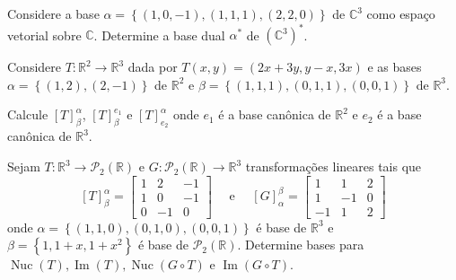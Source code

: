 \begin{questions}
	\question\label{exercício:2.14}

	Considere a base
	\begin{math}
		\alpha=
		\left\{
		\left(1,0,-1\right),
		\left(1,1,1\right),
		\left(2,2,0\right)
		\right\}
	\end{math}
	de $\mathbb{C}^{3}$ como espaço vetorial sobre $\mathbb{C}$.
	Determine a base dual $\alpha^{\ast}$ de
	${\left(\mathbb{C}^{3}\right)}^{\ast}$.

	\begin{solutionordottedlines}
	\end{solutionordottedlines}

	\question\label{exercício:2.15}

	Considere $T\colon\mathbb{R}^{2}\to\mathbb{R}^{3}$ dada por
	$T\left(x,y\right)=\left(2x+3y,y-x,3x\right)$ e as bases
	$\alpha=\left\{\left(1,2\right),\left(2,-1\right)\right\}$ de
	$\mathbb{R}^{2}$ e
	\begin{math}
		\beta=
		\left\{
		\left(1,1,1\right),
		\left(0,1,1\right),
		\left(0,0,1\right)
		\right\}
	\end{math}
	de $\mathbb{R}^{3}$.

	Calcule ${\left[T\right]}_{\beta}^{\alpha}$,
	${\left[T\right]}_{\beta}^{e_{1}}$ e
	${\left[T\right]}_{e_{2}}^{\alpha}$ onde $e_{1}$ é a base canônica
	de $\mathbb{R}^{2}$ e $e_{2}$ é a base canônica de
	$\mathbb{R}^{3}$.

	\begin{solutionordottedlines}
	\end{solutionordottedlines}

	\question\label{exercício:2.16}

	Sejam
	$T\colon\mathbb{R}^{3}\to\mathcal{P}_{2}\left(\mathbb{R}\right)$ e
	$G\colon\mathcal{P}_{2}\left(\mathbb{R}\right)\to\mathbb{R}^{3}$
	transformações lineares tais que
	\[
		{\left[T\right]}_{\beta}^{\alpha}=
		\begin{bmatrix*}
			1 & 2 & -1 \\
			1 & 0 & -1 \\
			0 & -1 & 0
		\end{bmatrix*}\quad
		\text { e }\quad
		{\left[G\right]}_{\alpha}^{\beta}=
		\begin{bmatrix*}
			1 & 1 & 2 \\
			1 & -1 & 0 \\
			-1 & 1 & 2
		\end{bmatrix*}
	\]
	onde
	\begin{math}
		\alpha=
		\left\{
		\left(1,1,0\right),
		\left(0,1,0\right),
		\left(0,0,1\right)
		\right\}
	\end{math}
	é base de $\mathbb{R}^{3}$ e $\beta=\left\{1,1+x,1+x^{2}\right\}$ é
	base de $\mathcal{P}_{2}\left(\mathbb{R}\right)$.
	Determine bases para
	\begin{math}
		\operatorname{Nuc}
		\left(T\right),
		\operatorname{Im}
		\left(T\right),
		\operatorname{Nuc}
		\left(G\circ T\right)
	\end{math}
	e $\operatorname{Im}\left(G\circ T\right)$.


\end{questions}
